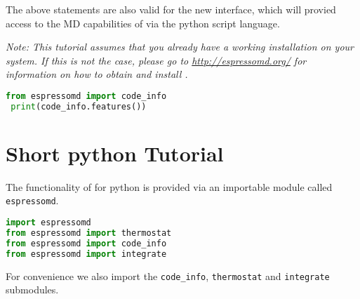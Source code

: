 \documentclass[
paper=a4,                       %
fontsize=11pt,                  %
twoside,                        %
footsepline,                    %
headsepline,                    %
headinclude=false,              %
footinclude=false,              %
pagesize,                       %
]{scrartcl}
\newtheorem{task}{Task}
\begin{document}
  The above statements are also valid for the new interface, which will provied
  access to the MD capabilities of \es{} via the python script language. 

\emph{Note: This tutorial assumes that you already have a working \es{}
installation on your system. If this is not the case, please go to
\url{http://espressomd.org/} for information on how to obtain and
install \es{}.}

%
%

\vspace{1cm}\vspace{1cm}

\begin{lstlisting}[language=Python]
 from espressomd import code_info
 print(code_info.features())
 \end{lstlisting}

\section{Short python Tutorial}\label{sec:python}
The functionality of \es{} for python is provided via an importable module called
\texttt{espressomd}.
\begin{lstlisting}[language=Python]
import espressomd
from espressomd import thermostat
from espressomd import code_info
from espressomd import integrate
\end{lstlisting}
For convenience we also import the \texttt{code\_info}, \texttt{thermostat} and
\texttt{integrate} submodules. 
\end{document}
